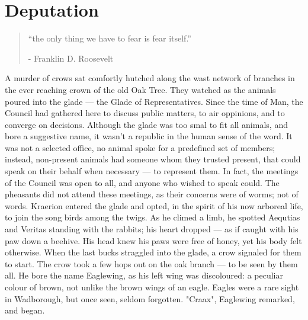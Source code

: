 \chapter{Deputation}

\vspace{-1.3cm}
\begin{localsize}{10}
	\begin{quote}
		“the only thing we have to fear is fear itself.”
		\begin{flushright}- Franklin D. Roosevelt \end{flushright}
	\end{quote} 
\end{localsize}
\vspace{1cm}

A murder of crows sat comfortly hutched along the wast network of branches in the ever reaching crown of the old Oak Tree. They watched as the animals poured into the glade — the Glade of Representatives. Since the time of Man, the Council had gathered here to discuss public matters, to air oppinions, and to converge on decisions. Although the glade was too smal to fit all animals, and bore a suggestive name, it wasn't a republic in the human sense of the word. It was not a selected office, no animal spoke for a predefined set of members; instead, non-present animals had someone whom they trusted present, that could speak on their behalf when necessary — to represent them.
In fact, the meetings of the Council was open to all, and anyone who wished to speak could. The pheasants did not attend these meetings, as their concerns were of worms; not of words.
Kraerion entered the glade and opted, in the spirit of his now arboreal life, to join the song birds among the twigs. As he climed a limb, he spotted Aequtias and Veritas standing with the rabbits; his heart dropped — as if caught with his paw down a beehive. His head knew his paws were free of honey, yet his body felt otherwise.
When the last bucks straggled into the glade, a crow signaled for them to start. The crow took a few hops out on the oak branch — to be seen by them all. He bore the name Eaglewing, as his left wing was discoloured: a peculiar colour of brown, not unlike the brown wings of an eagle. Eagles were a rare sight in Wadborough, but once seen, seldom forgotten.
"Craax", Eaglewing remarked, and began.

